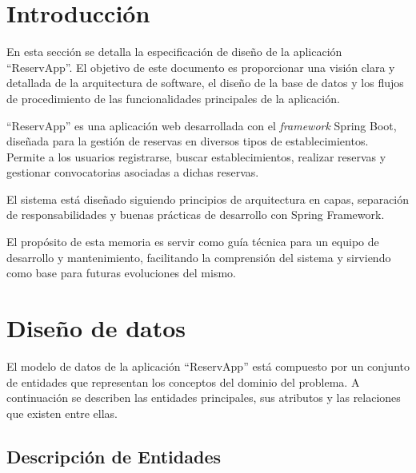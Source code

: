 
\section{Introducción}

En esta sección se detalla la especificación de diseño de la aplicación ``ReservApp''. El objetivo de este documento es proporcionar una visión clara y detallada de la arquitectura de software, el diseño de la base de datos y los flujos de procedimiento de las funcionalidades principales de la aplicación.

``ReservApp'' es una aplicación web desarrollada con el \emph{framework} Spring Boot, diseñada para la gestión de reservas en diversos tipos de establecimientos. Permite a los usuarios registrarse, buscar establecimientos, realizar reservas y gestionar convocatorias asociadas a dichas reservas.

El sistema está diseñado siguiendo principios de arquitectura en capas, separación de responsabilidades y buenas prácticas de desarrollo con Spring Framework.

El propósito de esta memoria es servir como guía técnica para un equipo de desarrollo y mantenimiento, facilitando la comprensión del sistema y sirviendo como base para futuras evoluciones del mismo.

\section{Diseño de datos}

El modelo de datos de la aplicación ``ReservApp'' está compuesto por un conjunto de entidades que representan los conceptos del dominio del problema. A continuación se describen las entidades principales, sus atributos y las relaciones que existen entre ellas.

\subsection{Descripción de Entidades}

